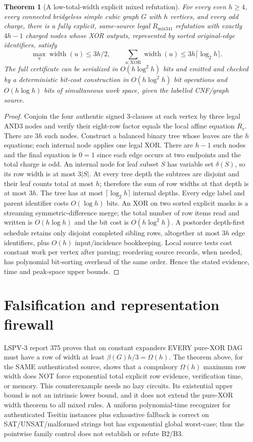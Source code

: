 \documentclass[11pt]{article}
\newtheorem{theorem}{Theorem}
\begin{document}
\begin{theorem}[A low-total-width explicit mixed refutation]
For every even $h\ge4$, every connected bridgeless simple cubic graph $G$ with $h$ vertices, and every odd charge, there is a fully explicit, same-source legal $R_{\mathrm{mix341}}$ refutation with exactly $4h-1$ charged nodes whose XOR outputs, represented by sorted original-edge identifiers, satisfy
\[
\max_u\operatorname{width}(u)\le3h/2,\qquad
\sum_{u:\mathrm{XOR}}\operatorname{width}(u)\le3h\lceil\log_2h\rceil.
\]
The full certificate can be serialized in $O(h\log^2h)$ bits and emitted and checked by a deterministic bit-cost construction in $O(h\log^2h)$ bit operations and $O(h\log h)$ bits of simultaneous work space, given the labelled CNF/graph source.
\end{theorem}
\begin{proof}
Conjoin the four authentic signed 3-clauses at each vertex by three legal AND3 nodes and verify their eight-row factor equals the local affine equation $R_v$. There are $3h$ such nodes. Construct a balanced binary tree whose leaves are the $h$ equations; each internal node applies one legal XOR. There are $h-1$ such nodes and the final equation is $0=1$ since each edge occurs at two endpoints and the total charge is odd.
An internal node for leaf subset $S$ has variable set $\delta(S)$, so its row width is at most $3|S|$. At every tree depth the subtrees are disjoint and their leaf counts total at most $h$; therefore the sum of row widths at that depth is at most $3h$. The tree has at most $\lceil\log_2 h\rceil$ internal depths. Every edge label and parent identifier costs $O(\log h)$ bits. An XOR on two sorted explicit masks is a streaming symmetric-difference merge; the total number of row items read and written is $O(h\log h)$ and the bit cost is $O(h\log^2h)$. A postorder depth-first schedule retains only disjoint completed sibling rows, altogether at most $3h$ edge identifiers, plus $O(h)$ input/incidence bookkeeping. Local source tests cost constant work per vertex after parsing; reordering source records, when needed, has polynomial bit-sorting overhead of the same order. Hence the stated evidence, time and peak-space upper bounds.
\end{proof}

\section*{Falsification and representation firewall}
LSPV-3 report 375 proves that on constant expanders EVERY pure-XOR DAG must have a row of width at least $\beta(G)h/3=\Omega(h)$. The theorem above, for the SAME authenticated source, shows that a compulsory $\Omega(h)$ maximum row width does NOT force exponential total explicit row evidence, verification time, or memory. This counterexample needs no lazy circuits. Its existential upper bound is not an intrinsic lower bound, and it does not extend the pure-XOR width theorem to all mixed rules. A uniform polynomial-time recognizer for authenticated Tseitin instances plus exhaustive fallback is correct on SAT/UNSAT/malformed strings but has exponential global worst-case; thus the pointwise family control does not establish or refute B2/B3.
\end{document}
